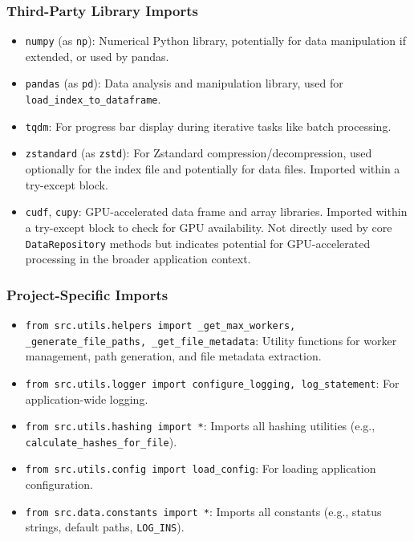 \documentclass{article}
\begin{document}
\subsubsection{Third-Party Library Imports}
\begin{itemize}
    \item \texttt{numpy} (as \texttt{np}): Numerical Python library, potentially for data manipulation if extended, or used by pandas.
    \item \texttt{pandas} (as \texttt{pd}): Data analysis and manipulation library, used for \texttt{load\_index\_to\_dataframe}.
    \item \texttt{tqdm}: For progress bar display during iterative tasks like batch processing.
    \item \texttt{zstandard} (as \texttt{zstd}): For Zstandard compression/decompression, used optionally for the index file and potentially for data files. Imported within a try-except block.
    \item \texttt{cudf}, \texttt{cupy}: GPU-accelerated data frame and array libraries. Imported within a try-except block to check for GPU availability. Not directly used by core \texttt{DataRepository} methods but indicates potential for GPU-accelerated processing in the broader application context.
\end{itemize}

\subsubsection{Project-Specific Imports}
\begin{itemize}
    \item \texttt{from src.utils.helpers import \_get\_max\_workers, \_generate\_file\_paths, \_get\_file\_metadata}: Utility functions for worker management, path generation, and file metadata extraction.
    \item \texttt{from src.utils.logger import configure\_logging, log\_statement}: For application-wide logging.
    \item \texttt{from src.utils.hashing import *}: Imports all hashing utilities (e.g., \texttt{calculate\_hashes\_for\_file}).
    \item \texttt{from src.utils.config import load\_config}: For loading application configuration.
    \item \texttt{from src.data.constants import *}: Imports all constants (e.g., status strings, default paths, \texttt{LOG\_INS}).
\end{itemize}
\end{document}
